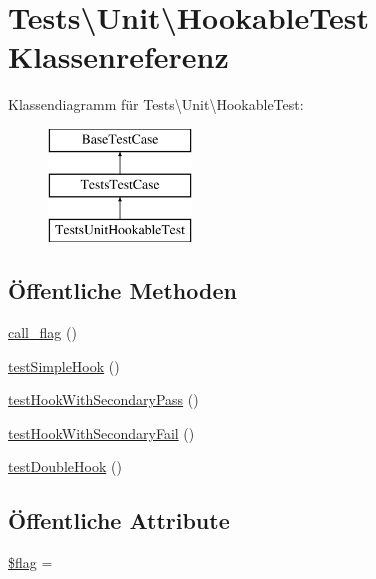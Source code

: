 \hypertarget{classTests_1_1Unit_1_1HookableTest}{}\section{Tests\textbackslash{}Unit\textbackslash{}Hookable\+Test Klassenreferenz}
\label{classTests_1_1Unit_1_1HookableTest}
Klassendiagramm für Tests\textbackslash{}Unit\textbackslash{}Hookable\+Test\+:\begin{figure}[H]
\begin{center}
\leavevmode
\includegraphics[height=3.000000cm]{d4/d86/classTests_1_1Unit_1_1HookableTest}
\end{center}
\end{figure}
\subsection*{Öffentliche Methoden}
\begin{DoxyCompactItemize}
\item 
\hyperlink{classTests_1_1Unit_1_1HookableTest_a5cf953a5f47d0aa751fa5583fb8422cf}{call\+\_\+flag} ()
\item 
\hyperlink{classTests_1_1Unit_1_1HookableTest_a099e833338d7554bf8dbaeae71032e4b}{test\+Simple\+Hook} ()
\item 
\hyperlink{classTests_1_1Unit_1_1HookableTest_a9aef4ce151084f68a9f117a8910617ae}{test\+Hook\+With\+Secondary\+Pass} ()
\item 
\hyperlink{classTests_1_1Unit_1_1HookableTest_aba8f4a7bf42d37f4c2345d9ceb0883dd}{test\+Hook\+With\+Secondary\+Fail} ()
\item 
\hyperlink{classTests_1_1Unit_1_1HookableTest_a3cb2b8b0d77efb2ab27b70065f4c5e24}{test\+Double\+Hook} ()
\end{DoxyCompactItemize}
\subsection*{Öffentliche Attribute}
\begin{DoxyCompactItemize}
\item 
\hyperlink{classTests_1_1Unit_1_1HookableTest_ab13cd0b2a20a632d14f336f033408587}{\$flag} = \textquotesingle{}\textquotesingle{}
\end{DoxyCompactItemize}
